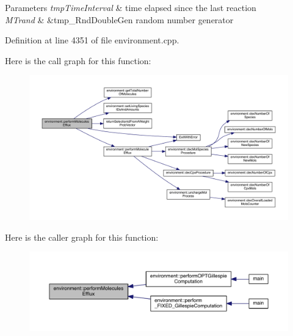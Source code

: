 \begin{DoxyParams}{Parameters}
{\em tmp\-Time\-Interval} & time elapsed since the last reaction \\
\hline
{\em M\-Trand} & \&tmp\-\_\-\-Rnd\-Double\-Gen random number generator \\
\hline
\end{DoxyParams}


Definition at line 4351 of file environment.\-cpp.



Here is the call graph for this function\-:
\nopagebreak
\begin{figure}[H]
\begin{center}
\leavevmode
\includegraphics[width=350pt]{a00014_acbbcdb4c77231e9ffa4c169e0caa0d0c_cgraph}
\end{center}
\end{figure}




Here is the caller graph for this function\-:
\nopagebreak
\begin{figure}[H]
\begin{center}
\leavevmode
\includegraphics[width=350pt]{a00014_acbbcdb4c77231e9ffa4c169e0caa0d0c_icgraph}
\end{center}
\end{figure}


